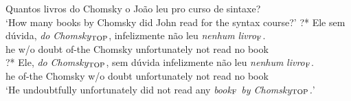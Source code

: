 \documentclass[output=paper]{langscibook}
\begin{document}
\begin{exe}
\ex \label{lacerda39}
\begin{xlist}
 \label{lacerda39A}
Quantos livros do Chomsky o João leu pro curso de sintaxe?\\
‘How many books by Chomsky did John read for the syntax course?’
 \label{lacerda39B1}
\gll ?* Ele 	sem dúvida, 	\emph{do} 	\emph{Chomsky}$_{\textnormal{TOP}}$, 	infelizmente 	não 	leu 	\emph{nenhum} 	\emph{livro}$_{\textnormal{F}}$.\\
{} he	w/o 	doubt 	of-the	Chomsky 	unfortunately	not 	read 	no 	book\\
 \label{lacerda39B2}
\gll ?* Ele, 	\emph{do} 	\emph{Chomsky}$_{\textnormal{TOP}}$, 	sem 	dúvida 	infelizmente 	não 	leu 	\emph{nenhum} 	\emph{livro}$_{\textnormal{F}}$.\\
{} he	of-the 	Chomsky 	w/o 	doubt 	unfortunately not 	read 	no 	book\\
\glt ‘He undoubtfully unfortunately did not read any \emph{book$_{\textnormal{F}}$ by Chomsky$_{\textnormal{TOP}}$.}’

\end{xlist}

\ex \label{lacerda40}
\begin{xlist}

\end{xlist}


\end{exe}
\end{document}
